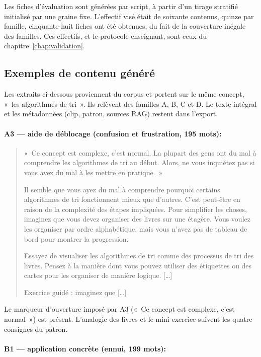 Les fiches d'évaluation sont générées par script, à partir d'un
tirage stratifié initialisé par une graine fixe. L'effectif visé
était de soixante contenus, quinze par famille, cinquante-huit
fiches ont été obtenues, du fait de la couverture inégale des
familles. Ces effectifs, et le protocole enseignant, sont ceux du
chapitre~\ref{chap:validation}.

\subsection{Exemples de contenu généré}
\label{subsec:exemples-contenu}

Les extraits ci-dessous proviennent du corpus et portent sur le même
concept, «~les algorithmes de tri~». Ils relèvent des familles A, B,
C et D. Le texte intégral et les métadonnées (clip, patron, sources
RAG) restent dans l'export.

\paragraph{A3 --- aide de déblocage (confusion et frustration, 195 mots):}

\begin{quote}
\small
«~Ce concept est complexe, c'est normal. La plupart des gens ont du mal
à comprendre les algorithmes de tri au début. Alors, ne vous inquiétez
pas si vous avez du mal à les mettre en pratique.~»

Il semble que vous ayez du mal à comprendre pourquoi certains
algorithmes de tri fonctionnent mieux que d'autres. C'est peut-être en
raison de la complexité des étapes impliquées. Pour simplifier les
choses, imaginez que vous devez organiser des livres sur une étagère.
Vous voulez les organiser par ordre alphabétique, mais vous n'avez pas
de tableau de bord pour montrer la progression.

Essayez de visualiser les algorithmes de tri comme des processus de tri
des livres. Pensez à la manière dont vous pouvez utiliser des étiquettes
ou des cartes pour les organiser de manière logique. [\ldots]

Exercice guidé : imaginez que [\ldots]
\end{quote}

Le marqueur d'ouverture imposé par A3 («~Ce concept est complexe, c'est
normal~») est présent. L'analogie des livres et le mini-exercice
suivent les quatre consignes du patron.

\paragraph{B1 --- application concrète (ennui, 199 mots):}

